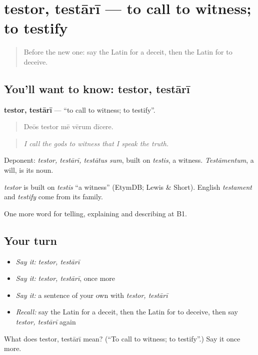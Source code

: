 \section[testor, testārī]{testor, testārī — to call to witness; to testify}

\label{lesson:LA-C399-testor}



\begin{quote}
Before the new one: say the Latin for a deceit, then the Latin for to deceive.
\end{quote}

\subsection*{You'll want to know: testor, testārī}
\textbf{testor, testārī} — \textquotedblleft{}to call to witness; to testify\textquotedblright{}.

\begin{quote}
Deōs testor mē vērum dīcere.
\end{quote}

\begin{quote}
\emph{I call the gods to witness that I speak the truth.}
\end{quote}

Deponent: \emph{testor, testārī, testātus sum}, built on \emph{testis}, a witness. \emph{Testāmentum}, a will, is its noun.

\begin{cousinweb}
\emph{testor} is built on \emph{testis} \textquotedblleft{}a witness\textquotedblright{} (EtymDB; Lewis \& Short). English \emph{testament} and \emph{testify} come from its family.
\end{cousinweb}

\begin{grammarlens}[title={What you've built}]
One more word for telling, explaining and describing at B1.
\end{grammarlens}

\subsection*{Your turn}
\begin{itemize}
\raggedright
  \item \emph{Say it:} \emph{testor, testārī}
  \item \emph{Say it:} \emph{testor, testārī}, once more
  \item \emph{Say it:} a sentence of your own with \emph{testor, testārī}
  \item \emph{Recall:} say the Latin for a deceit, then the Latin for to deceive, then say \emph{testor, testārī} again
\end{itemize}

\begin{tcolorbox}[breakable,colback=teal!4,colframe=teal!35!black,title={Before you move on}]
What does testor, testārī mean? (\textquotedblleft{}To call to witness; to testify\textquotedblright{}.) Say it once more.
\end{tcolorbox}
